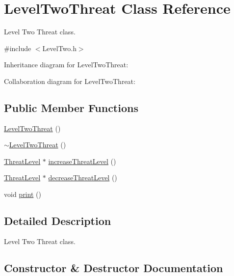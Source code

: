\hypertarget{classLevelTwoThreat}{}\section{Level\+Two\+Threat Class Reference}
\label{classLevelTwoThreat}


Level Two Threat class.  




{\ttfamily \#include $<$Level\+Two.\+h$>$}



Inheritance diagram for Level\+Two\+Threat\+:


Collaboration diagram for Level\+Two\+Threat\+:
\subsection*{Public Member Functions}
\begin{DoxyCompactItemize}
\item 
\hyperlink{classLevelTwoThreat_a862bf482af05fb712da3f02564653ee1}{Level\+Two\+Threat} ()
\item 
\hyperlink{classLevelTwoThreat_af07b8e6bfd18b564a83c41cae1ffb37a}{$\sim$\+Level\+Two\+Threat} ()
\item 
\hyperlink{classThreatLevel}{Threat\+Level} $\ast$ \hyperlink{classLevelTwoThreat_a54b4d396cdd27504f1a8063c04be5bcf}{increase\+Threat\+Level} ()
\item 
\hyperlink{classThreatLevel}{Threat\+Level} $\ast$ \hyperlink{classLevelTwoThreat_a1d9e88b0f43396721a2f51ae67191359}{decrease\+Threat\+Level} ()
\item 
void \hyperlink{classLevelTwoThreat_a9e21bc1a55bb25d86346c484f5fd0525}{print} ()
\end{DoxyCompactItemize}


\subsection{Detailed Description}
Level Two Threat class. 

\subsection{Constructor \& Destructor Documentation}
\mbox{\label{classLevelTwoThreat_a862bf482af05fb712da3f02564653ee1}} 
